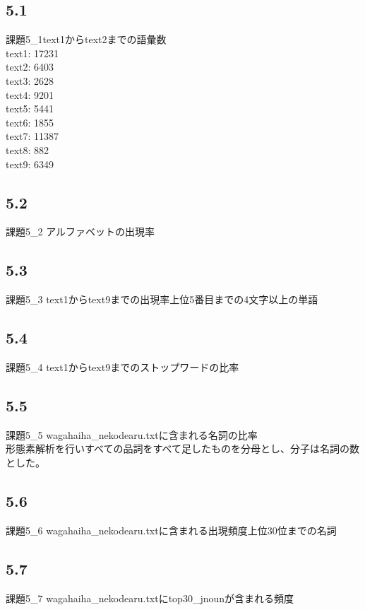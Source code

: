\documentclass[a4j]{jarticle}
\begin{document}
\subsection*{5.1}
  課題5\_1text1からtext2までの語彙数\\
  text1: 17231\\
  text2: 6403\\
  text3: 2628\\
  text4: 9201\\
  text5: 5441\\
  text6: 1855\\
  text7: 11387\\
  text8: 882\\
  text9: 6349
\subsection*{5.2}
  課題5\_2 アルファベットの出現率\\
  \fontsize{5.5pt}{0pt}
\subsection*{5.3}
  課題5\_3 text1からtext9までの出現率上位5番目までの4文字以上の単語\\
  \fontsize{10pt}{5pt}
\subsection*{5.4}
  課題5\_4 text1からtext9までのストップワードの比率\\
  \fontsize{10pt}{10pt}
\subsection*{5.5}
  課題5\_5 wagahaiha\_nekodearu.txtに含まれる名詞の比率\\
  形態素解析を行いすべての品詞をすべて足したものを分母とし、分子は名詞の数とした。\\
  \fontsize{10pt}{10pt}
\subsection*{5.6}
  課題5\_6 wagahaiha\_nekodearu.txtに含まれる出現頻度上位30位までの名詞\\
  \fontsize{10pt}{10pt}
\subsection*{5.7}
  課題5\_7 wagahaiha\_nekodearu.txtにtop30\_jnounが含まれる頻度\\
  \fontsize{10pt}{10pt}
\end{document}
